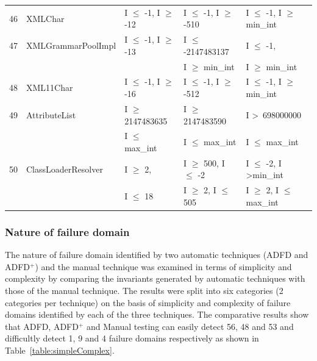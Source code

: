 {\begin{longtable}{|l|l|l|l|l|}
46	& XMLChar					& I $\le$ -1, I $\ge$ -12			& I $\le$ -1, I $\ge$ -510			& I $\le$ -1, I $\ge$ min\_int	\\
47	& XMLGrammarPoolImpl		& I $\le$ -1, I $\ge$ -13			& I $\le$ -2147483137 			& I $\le$ -1, 							\\ 
	&							&								& I $\ge$ min\_int				& I $\ge$ min\_int				\\
48	& XML11Char				& I $\le$ -1, I $\ge$ -16			& I $\le$ -1, I $\ge$ -512			& I $\le$ -1, I $\ge$ min\_int	\\ 
49	& AttributeList				& I $\ge$ 2147483635			& I $\ge$ 2147483590			& I \textgreater~698000000					\\ 
	&                                             & I $\le$ max\_int					& I $\le$ max\_int					& I $\le$ max\_int				\\
50	& ClassLoaderResolver		&  I $\ge$ 2,						& I $\ge$ 500, I $\le$ -2			& I $\le$ -2, I \textgreater min\_int  	\\ 
	& \label{table:stripDomains7}  &  I $\le$ 18						& I $\ge$ 2, I $\le$ 505			& I $\ge$ 2, I $\le$ max\_int	\\ \hline
	
\end{longtable}
}




\subsubsection{Nature of failure domain} \label{sec:nature}
The nature of failure domain identified by two automatic techniques (ADFD and ADFD$^+$) and the manual technique was examined in terms of simplicity and complexity by comparing the invariants generated by automatic techniques with those of the manual technique. The results were split into six categories (2 categories per technique) on the basis of simplicity and complexity of failure domains identified by each of the three techniques. The comparative results show that ADFD, ADFD$^+$ and Manual testing can easily detect 56, 48 and 53 and difficultly detect 1, 9 and 4 failure domains respectively as shown in Table~\ref{table:simpleComplex}.


\bigskip

